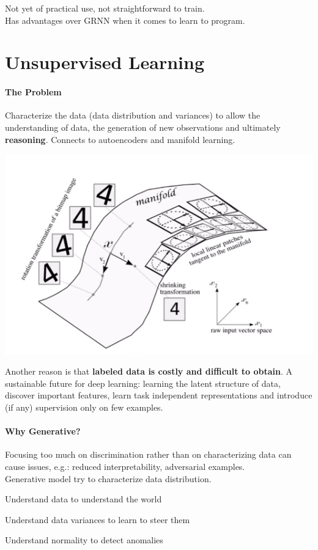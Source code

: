 \documentclass[10pt]{report}
\begin{document}
Not yet of practical use, not straightforward to train.\\
Has advantages over GRNN when it comes to learn to program.
\section{Unsupervised Learning}
\paragraph{The Problem} Characterize the data (data distribution and variances) to allow the understanding of data, the generation of new observations and ultimately \textbf{reasoning}. Connects to autoencoders and manifold learning.\begin{center}
	\includegraphics[scale=0.5]{138.png}
\end{center}
Another reason is that \textbf{labeled data is costly and difficult to obtain}. A sustainable future for deep learning: learning the latent structure of data, discover important features, learn task independent representations and introduce (if any) supervision only on few examples.
\paragraph{Why Generative?} Focusing too much on discrimination rather than on characterizing data can cause issues, e.g.: reduced interpretability, adversarial examples.\\
Generative model try to characterize data distribution. \begin{list}{}{}
	\item Understand data to understand the world
	\item Understand data variances to learn to steer them
	\item Understand normality to detect anomalies
\end{list}
\end{document}
